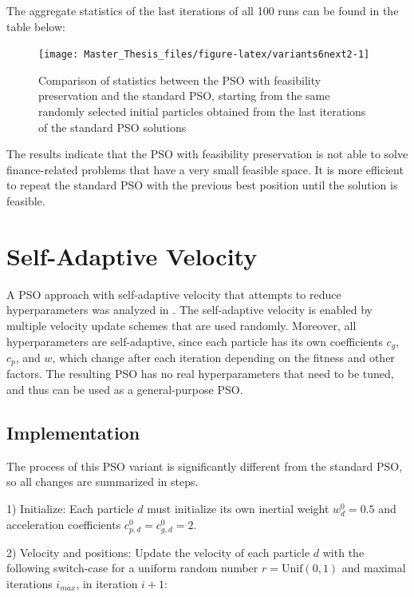 \documentclass[
  oneside, a4paper, 12pt, openany]{book}
\theoremstyle{definition}
\theoremstyle{definition}
\theoremstyle{definition}
\theoremstyle{definition}
\theoremstyle{remark}
\begin{document}
The aggregate statistics of the last iterations of all 100 runs can be found in the table below:

\begin{figure}[H]
\texttt{[image: Master\_Thesis\_files/figure-latex/variants6next2-1]} \caption{Comparison of statistics between the PSO with feasibility preservation and the standard PSO, starting from the same randomly selected initial particles obtained from the last iterations of the standard PSO solutions}\label{fig:variants6next2}
\end{figure}

The results indicate that the PSO with feasibility preservation is not able to solve finance-related problems that have a very small feasible space. It is more efficient to repeat the standard PSO with the previous best position until the solution is feasible.

\hypertarget{self-adaptive-velocity}{%
\section{Self-Adaptive Velocity}\label{self-adaptive-velocity}}

A PSO approach with self-adaptive velocity that attempts to reduce hyperparameters was analyzed in \citep{FaYa2014}. The self-adaptive velocity is enabled by multiple velocity update schemes that are used randomly. Moreover, all hyperparameters are self-adaptive, since each particle has its own coefficients \(c_g\), \(c_p\), and \(w\), which change after each iteration depending on the fitness and other factors. The resulting PSO has no real hyperparameters that need to be tuned, and thus can be used as a general-purpose PSO.

\hypertarget{implementation-2}{%
\subsection{Implementation}\label{implementation-2}}

The process of this PSO variant is significantly different from the standard PSO, so all changes are summarized in steps.

1) Initialize: Each particle \(d\) must initialize its own inertial weight \(w_d^0=0.5\) and acceleration coefficients \(c_{p,d}^0 = c_{g,d}^0 = 2\).

2) Velocity and positions: Update the velocity of each particle \(d\) with the following switch-case for a uniform random number \(r = \text{Unif}(0,1)\) and maximal iterations \(i_{max}\), in iteration \(i+1\):
\end{document}
